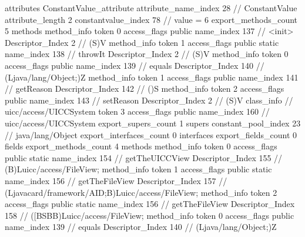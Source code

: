 {{{{{				attributes {
				ConstantValue_attribute {
					attribute_name_index	28		// ConstantValue
					attribute_length	2
					constantvalue_index	78		// value = 6
				}
				}
			}
			}
			export_methods_count	5
			methods {
				method_info {
					token	0
					access_flags	public
					name_index	137		// <init>
					Descriptor_Index	2		// (S)V
				}
				method_info {
					token	1
					access_flags	public static
					name_index	138		// throwIt
					Descriptor_Index	2		// (S)V
				}
				method_info {
					token	0
					access_flags	public
					name_index	139		// equals
					Descriptor_Index	140		// (Ljava/lang/Object;)Z
				}
				method_info {
					token	1
					access_flags	public
					name_index	141		// getReason
					Descriptor_Index	142		// ()S
				}
				method_info {
					token	2
					access_flags	public
					name_index	143		// setReason
					Descriptor_Index	2		// (S)V
				}
			}
		}
		class_info {		// uicc/access/UICCSystem
			token	3
			access_flags	public
			name_index	160		// uicc/access/UICCSystem
			export_supers_count	1
			supers {
				constant_pool_index	23		// java/lang/Object
			}
			export_interfaces_count	0
			interfaces {
			}
			export_fields_count	0
			fields {
			}
			export_methods_count	4
			methods {
				method_info {
					token	0
					access_flags	public static
					name_index	154		// getTheUICCView
					Descriptor_Index	155		// (B)Luicc/access/FileView;
				}
				method_info {
					token	1
					access_flags	public static
					name_index	156		// getTheFileView
					Descriptor_Index	157		// (Ljavacard/framework/AID;B)Luicc/access/FileView;
				}
				method_info {
					token	2
					access_flags	public static
					name_index	156		// getTheFileView
					Descriptor_Index	158		// ([BSBB)Luicc/access/FileView;
				}
				method_info {
					token	0
					access_flags	public
					name_index	139		// equals
					Descriptor_Index	140		// (Ljava/lang/Object;)Z
				}
			}
		}
	}
}
